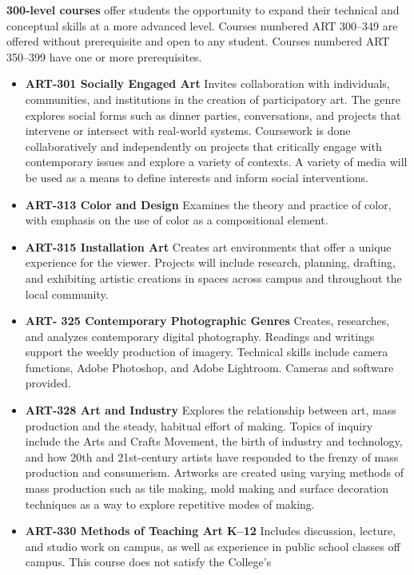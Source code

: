 \documentclass[
  letterpaper,
]{scrbook}
\providecommand{\tightlist}{%
  \setlength{\itemsep}{0pt}\setlength{\parskip}{0pt}}
\begin{document}
\textbf{300-level courses} offer students the opportunity to expand
their technical and conceptual skills at a more advanced level. Courses
numbered ART 300--349 are offered without prerequisite and open to any
student. Courses numbered ART 350--399 have one or more prerequisites.

\begin{itemize}
\tightlist
\item
  \textbf{ART-301 Socially Engaged Art} Invites collaboration with
  individuals, communities, and institutions in the creation of
  participatory art. The genre explores social forms such as dinner
  parties, conversations, and projects that intervene or intersect with
  real-world systems. Coursework is done collaboratively and
  independently on projects that critically engage with contemporary
  issues and explore a variety of contexts. A variety of media will be
  used as a means to define interests and inform social interventions.
\item
  \textbf{ART-313 Color and Design} Examines the theory and practice of
  color, with emphasis on the use of color as a compositional element.
\item
  \textbf{ART-315 Installation Art} Creates art environments that offer
  a unique experience for the viewer. Projects will include research,
  planning, drafting, and exhibiting artistic creations in spaces across
  campus and throughout the local community.
\item
  \textbf{ART- 325 Contemporary Photographic Genres} Creates,
  researches, and analyzes contemporary digital photography. Readings
  and writings support the weekly production of imagery. Technical
  skills include camera functions, Adobe Photoshop, and Adobe Lightroom.
  Cameras and software provided.
\item
  \textbf{ART-328 Art and Industry} Explores the relationship between
  art, mass production and the steady, habitual effort of making. Topics
  of inquiry include the Arts and Crafts Movement, the birth of industry
  and technology, and how 20th and 21st-century artists have responded
  to the frenzy of mass production and consumerism. Artworks are created
  using varying methods of mass production such as tile making, mold
  making and surface decoration techniques as a way to explore
  repetitive modes of making.
\item
  \textbf{ART-330 Methods of Teaching Art K--12} Includes discussion,
  lecture, and studio work on campus, as well as experience in public
  school classes off campus. This course does not satisfy the College's

\end{itemize}
\end{document}
